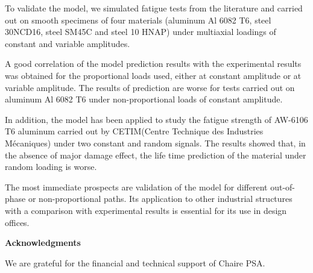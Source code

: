 To validate the model, we simulated fatigue tests from the literature and carried out on smooth specimens of four materials (aluminum Al 6082 T6,  steel 30NCD16, steel SM45C and steel 10 HNAP) under multiaxial loadings of constant and variable amplitudes.

A good correlation of the model prediction results with the experimental results was obtained for the proportional loads used, either at constant amplitude or at variable amplitude. The results of prediction are worse for tests carried out on aluminum Al 6082 T6 under non-proportional loads of constant amplitude.

In addition, the model has been applied to study the fatigue strength of AW-6106 T6 aluminum carried out by CETIM(Centre Technique des Industries Mécaniques) under two constant and random signals. The results showed that, in the absence of major damage effect, the life time prediction of the material under random loading is worse. 

The most immediate prospects are validation of the model for different out-of-phase or non-proportional paths. Its application to other industrial structures with a comparison with experimental results is essential for its use in design offices.


\vspace{6pt}
\noindent
\textbf{Acknowledgments}

\vspace{6pt}
We are grateful for the financial and technical support of Chaire PSA.


